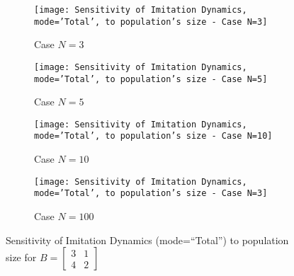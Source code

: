 	\begin{figure}[h]
		\centering
		\begin{subfigure}[t]{.49\textwidth}
			\centering
			\texttt{[image: Sensitivity of Imitation Dynamics, mode='Total', to population's size - Case N=3]}
			\caption{Case $N=3$}
			\label{fig:example26}
		\end{subfigure}
		\begin{subfigure}[t]{.49\textwidth}
			\centering
			\texttt{[image: Sensitivity of Imitation Dynamics, mode='Total', to population's size - Case N=5]}
			\caption{Case $N=5$}
			\label{fig:example27}
		\end{subfigure}
		\begin{subfigure}[t]{.49\textwidth}
			\centering
			\texttt{[image: Sensitivity of Imitation Dynamics, mode='Total', to population's size - Case N=10]}
			\caption{Case $N=10$}
			\label{fig:example28}
		\end{subfigure}
		\begin{subfigure}[t]{.49\textwidth}
			\centering
			\texttt{[image: Sensitivity of Imitation Dynamics, mode='Total', to population's size - Case N=3]}
			\caption{Case $N=100$}
			\label{fig:example29}
		\end{subfigure}
		\caption{Sensitivity of Imitation Dynamics (mode=``Total'') to population size for $B = \begin{bmatrix} 3 & 1 \\ 4 & 2 \end{bmatrix}$}
		\label{fig:Sensitivity of Imitation Dynamics, mode='Total', to population's size}
	\end{figure}
	
